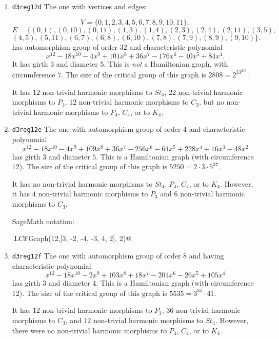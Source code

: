\documentclass[12pt,letterpaper]{article}
\theoremstyle{definition}
\begin{document}
\begin{enumerate}
It has no non-trivial harmonic morphisms to $St_4$, $P_4$, $C_3$, $C_4$, or to $K_4$.
However, it has $6$ non-trivial harmonic morphisms to $P_3$.


\item
  {\tt d3reg12d}\newline %
The one with vertices and edges:

\[
V=\{ 0,1,2,3,4,5,6,7,8,9,10,11\},
\]
\[
E = \{
(0, 1), (0, 10), (0, 11), (1, 3), (1, 4), (2, 3), (2, 4), (2, 11), (3, 5),
\]
\[
(4, 5), (5, 11), (6, 7), (6, 8), (6, 10), (7, 8), (7, 9), (8, 9), (9, 10)
\}.
\]
has automorphism group of order $32$ and
characteristic polynomial  
\[
x^{12} - 18x^{10} - 4x^9 + 101x^8 + 36x^7 - 176x^6 - 40x^5 + 84x^4 .
\]
It has girth $3$ and diameter $5$.
This is {\it not} a Hamiltonian graph, with circumference $7$.
The size of the critical group of this graph is $2808=2^33^313$.

It has $12$ non-trivial harmonic morphisms to $St_4$,
$22$ non-trivial harmonic morphisms to $P_3$, 
$12$ non-trivial harmonic morphisms to $C_3$, but
no non-trivial harmonic morphisms to $P_4$, $C_4$, or to $K_4$.


\item
  {\tt d3reg12e}\newline %
 The one with automorphism group of order $4$ and
characteristic polynomial  
\[
x^{12} - 18x^{10} - 4x^9 + 109x^8 + 36x^7 - 256x^6 - 64x^5 + 228x^4 + 16x^3 - 48x^2 
\]
has girth $3$ and diameter $5$.
This is a Hamiltonian graph (with circumference $12$).
The size of the critical group of this graph is $5250=2\cdot 3\cdot 5^37$.

It has no non-trivial harmonic morphisms to $St_4$, $P_4$, $C_4$, or to $K_4$.
However, it has $4$ non-trivial harmonic morphisms to $P_3$ and
$6$ non-trivial harmonic morphisms to $C_3$.

SageMath notation:

\verb@graphs.LCFGraph(12,[3, -2, -4, -3, 4, 2], 2)@


\item
  {\tt d3reg12f}\newline %
The one with automorphism group of order $8$ and
having characteristic polynomial  
\[
x^{12} - 18x^{10} - 2x^9 + 103x^8 + 18x^7 - 201x^6 - 26x^5 + 105x^4 
\]
has girth $3$ and diameter $4$.
This is a Hamiltonian graph (with circumference $12$).
The size of the critical group of this graph is $5535=3^35\cdot 41$.

It has $12$ non-trivial harmonic morphisms to $P_3$,
$36$ non-trivial harmonic morphisms to $C_3$, and
$12$ non-trivial harmonic morphisms to $St_4$.
However, there were no
non-trivial harmonic morphisms to $P_4$, $C_4$, or to $K_4$.


\end{enumerate}
\end{document}
